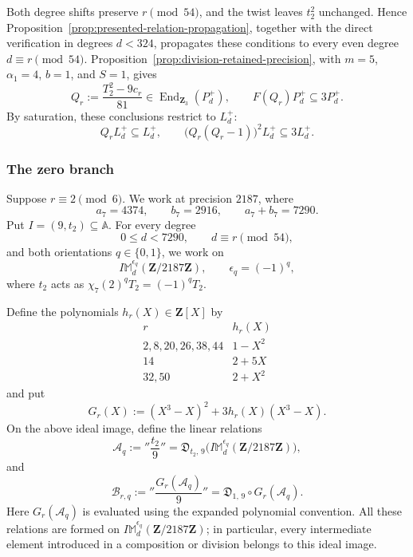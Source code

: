 \documentclass[11pt]{article}
\newcommand{\End}{\operatorname{End}}
\theoremstyle{plain}
\theoremstyle{definition}
\theoremstyle{remark}
\numberwithin{equation}{section}
\begin{document}
Both degree shifts preserve \(r\pmod{54}\), and the twist leaves \(t_2^2\) unchanged. Hence Proposition~\ref{prop:presented-relation-propagation}, together with the direct verification in degrees \(d<324\), propagates these conditions to every even degree \(d\equiv r\pmod{54}\). Proposition~\ref{prop:division-retained-precision}, with \(m=5\), \(\alpha_1=4\), \(b=1\), and \(S=1\), gives \[ Q_r:=\frac{T_2^2-9c_r}{81} \in\End_{\mathbf Z_3}(P_d^+), \qquad F(Q_r)P_d^+\subseteq3P_d^+. \] By saturation, these conclusions restrict to \(L_d^+\): \begin{equation} Q_rL_d^+\subseteq L_d^+, \qquad \bigl(Q_r(Q_r-1)\bigr)^2L_d^+\subseteq3L_d^+. \label{eq:p3-nonzero-relations} \end{equation}

\subsubsection{The zero branch}

Suppose \(r\equiv2\pmod6\). We work at precision \(2187\), where \[ a_7=4374,\qquad b_7=2916,\qquad a_7+b_7=7290. \] Put \(I=(9,t_2)\subseteq\mathbb A\). For every degree \[ 0\leq d<7290,\qquad d\equiv r\pmod{54}, \] and both orientations \(q\in\{0,1\}\), we work on \[ I\mathbb M_d^{\epsilon_q}(\mathbf Z/2187\mathbf Z), \qquad \epsilon_q=(-1)^q, \] where \(t_2\) acts as \(\chi_7(2)^qT_2=(-1)^qT_2\).

Define the polynomials \(h_r(X)\in\mathbf Z[X]\) by \[ \begin{array}{c|c} r & h_r(X)\\ \hline 2,8,20,26,38,44 & 1-X^2\\ 14 & 2+5X\\ 32,50 & 2+X^2 \end{array} \] and put \[ G_r(X):=(X^3-X)^2+3h_r(X)(X^3-X). \] On the above ideal image, define the linear relations \[ \mathcal A_q:= ''\frac{t_2}{9}'' = \mathfrak D_{t_2,\,9} \bigl(I\mathbb M_d^{\epsilon_q} (\mathbf Z/2187\mathbf Z)\bigr), \] and \[ \mathcal B_{r,q}:= ''\frac{G_r(\mathcal A_q)}{9}'' = \mathfrak D_{1,\,9}\circ G_r(\mathcal A_q). \] Here \(G_r(\mathcal A_q)\) is evaluated using the expanded polynomial convention. All these relations are formed on \(I\mathbb M_d^{\epsilon_q}(\mathbf Z/2187\mathbf Z)\); in particular, every intermediate element introduced in a composition or division belongs to this ideal image. 
\end{document}
